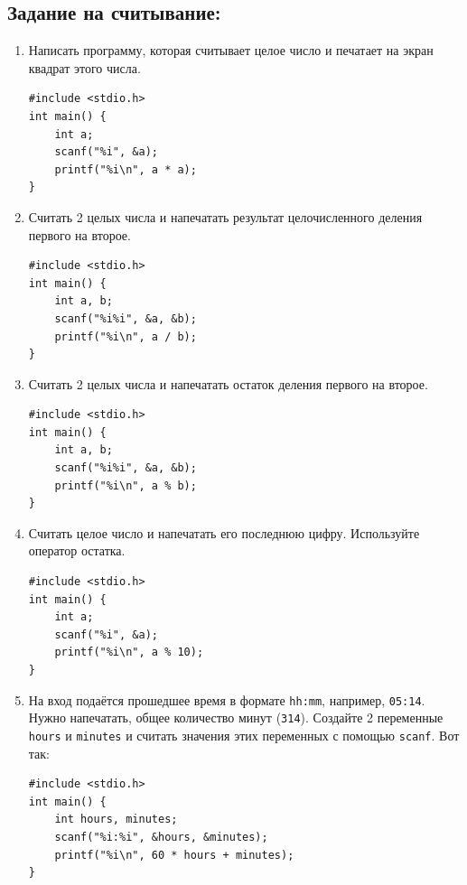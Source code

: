\documentclass{article}
\begin{document}
\subsection*{Задание на считывание:}
\begin{enumerate}
\item Написать программу, которая считывает целое число и печатает на экран квадрат этого числа.
\begin{lstlisting}[backgroundcolor = \color{solcolor}]
#include <stdio.h>
int main() {
	int a;
	scanf("%i", &a);
	printf("%i\n", a * a);
}
\end{lstlisting}
\item Считать 2 целых числа и напечатать результат целочисленного деления первого на второе.

\begin{lstlisting}[backgroundcolor = \color{solcolor}]
#include <stdio.h>
int main() {
	int a, b;
	scanf("%i%i", &a, &b);
	printf("%i\n", a / b);
}
\end{lstlisting}
\item Считать 2 целых числа и напечатать остаток деления первого на второе.
\begin{lstlisting}[backgroundcolor = \color{solcolor}]
#include <stdio.h>
int main() {
	int a, b;
	scanf("%i%i", &a, &b);
	printf("%i\n", a % b);
}
\end{lstlisting}
\item Считать целое число и напечатать его последнюю цифру. Используйте оператор остатка.
\begin{lstlisting}[backgroundcolor = \color{solcolor}]
#include <stdio.h>
int main() {
	int a;
	scanf("%i", &a);
	printf("%i\n", a % 10);
}
\end{lstlisting}
\item На вход подаётся прошедшее время в формате \texttt{hh:mm}, например, \texttt{05:14}. Нужно напечатать, общее количество минут (\texttt{314}). Создайте 2 переменные \texttt{hours} и \texttt{minutes} и считать значения этих переменных с помощью \texttt{scanf}. Вот так:
\begin{lstlisting}[backgroundcolor = \color{solcolor}]
#include <stdio.h>
int main() {
	int hours, minutes;
	scanf("%i:%i", &hours, &minutes);
	printf("%i\n", 60 * hours + minutes);
}
\end{lstlisting}
\end{enumerate}
\end{document}
